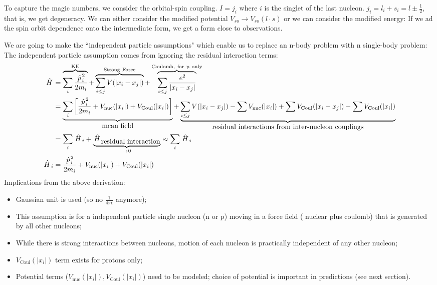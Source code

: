 \documentclass{school-22.101-notes}
\begin{document}
To capture the magic numbers, we consider the orbital-spin coupling. $I = j_i$ where $i$ is the singlet of the last nucleon. $j_i = l_i + s_i = l\pm \frac{1}{2}$, that is, we get degeneracy.  We can either consider the modified potential $V_{so} \to V_{so} (l \cdot s)$  or we can consider the modified energy: 
If we ad the spin orbit dependence onto the intermediate form, we get a form close to observations. 



We are going to make the ``independent particle assumptions" which enable us to replace an n-body problem with n single-body problem:
The independent particle assumption comes from ignoring the residual interaction terms: 
\begin{align}
 \left. \hat{H} \right. &= \overbrace{\displaystyle\sum_i \frac{\left. \hat{p} \right.^2_i}{2m_i}}^{\mathrm{KE}} + \overbrace{\displaystyle\sum_{i \le j} V(|x_i - x_j|)}^{\mathrm{Strong \mbox{ } Force}} + \overbrace{\displaystyle\sum_{i \le j} \frac{e^2}{|x_i - x_j|}}^{\mathrm{Coulomb, \mbox{ } for \mbox{ } p \mbox{ } only}} \\
 &= \underbrace{ \displaystyle\sum_i \left[ \frac{\left. \hat{p} \right.^2_i}{2m_i} + V_{\mathrm{nuc}} (|x_i|) + V_{\mathrm{Coul}} (|x_i|)  \right]}_{\mbox{mean field}}  + \underbrace{\displaystyle\sum_{i \le j} V(|x_i - x_j|) - \displaystyle\sum V_{\mathrm{nuc}} (|x_i|) + \displaystyle\sum V_{\mathrm{Coul}} (|x_i - x_j|) - \displaystyle\sum V_{\mathrm{Coul}} (|x_i|) }_{\mbox{residual interactions from inter-nucleon couplings} } \\
 &= \displaystyle\sum_i \left. \hat{H} \right._i + \underbrace{\left. \hat{H} \right._{\mbox{residual interaction}}}_{\to 0} \approx \displaystyle\sum_i \left. \hat{H} \right._i \\
\left. \hat{H} \right._i &= \frac{\left. \hat{p} \right.^2_i}{2m_i} + V_{\mathrm{nuc}} (|x_i|) + V_{\mathrm{Coul}} (|x_i|) 
\end{align}
Implications from the above derivation:
\begin{itemize}
\item Gaussian unit is used (so no $\frac{1}{4 \pi \epsilon}$ anymore); 
\item This assumption is for a independent particle single nucleon (n or p) moving in a force field ( nuclear plus coulomb) that is generated by all other nucleons; 
\item While there is strong interactions between nucleons, motion of each nucleon is practically independent of any other nucleon; 
\item $V_{\mathrm{Coul}} (|x_i|)$ term exists for protons only; 
\item Potential terms ($V_{\mathrm{nuc}} (|x_i|), V_{\mathrm{Coul}} (|x_i|)$) need to be modeled; choice of potential is important in predictions (see next section).
\end{itemize}
\end{document}
